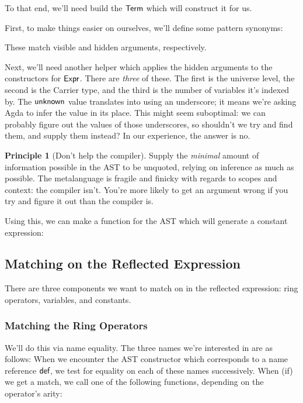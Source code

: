 \documentclass[draft, twocolumn]{article}
\theoremstyle{definition}
\theoremstyle{definition}
\newtheorem{principle}{Principle}[section]
\begin{document}
To that end, we'll need build the \(\AgdaDatatype{Term}\) which will construct
it for us.

First, to make things easier on ourselves, we'll define some pattern synonyms:

These match visible and hidden arguments, respectively.

Next, we'll need another helper which applies the hidden arguments to the
constructors for \(\AgdaDatatype{Expr}\). There are \emph{three} of these. The
first is the universe level, the second is the Carrier type, and the third is
the number of variables it's indexed by.
The \(\AgdaInductiveConstructor{unknown}\) value translates into using an
underscore; it means we're asking Agda to infer the value in its place. This
might seem suboptimal: we can probably figure out the values of those
underscores, so shouldn't we try and find them, and supply them instead? In our
experience, the answer is no.

\begin{principle}[Don't help the compiler]
  Supply the \emph{minimal} amount of information possible in the AST to be
  unquoted, relying on inference as much as possible. The metalanguage is
  fragile and finicky with regards to scopes and context: the compiler isn't.
  You're more likely to get an argument wrong if you try and figure it out than
  the compiler is.
\end{principle}

Using this, we can make a function for the AST which will generate a constant
expression:
\subsection{Matching on the Reflected Expression}
There are three components we want to match on in the reflected expression: ring
operators, variables, and constants.
\subsubsection{Matching the Ring Operators}
We'll do this via name equality. The three names we're interested in are as
follows:
When we encounter the AST constructor which corresponds to a name reference
\(\AgdaInductiveConstructor{def}\), we test for equality on each of these names
successively. When (if) we get a match, we call one of the following functions,
depending on the operator's arity:
\end{document}
